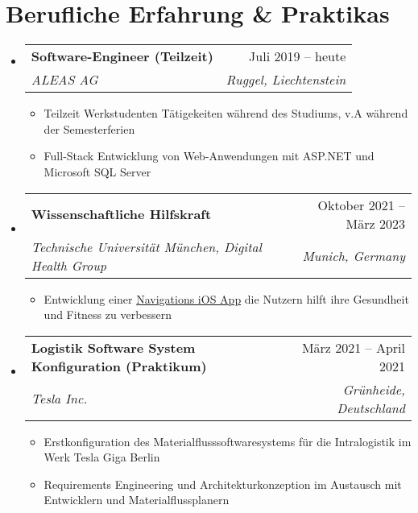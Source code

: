 \documentclass[letterpaper,11pt]{article}
\makeatletter
\newcommand{\resumeItem}[1]{
  \item\small{
    {#1 \vspace{-2pt}}
  }
}
\newcommand{\resumeSubheading}[4]{
  \vspace{-2pt}\item
    \begin{tabular*}{0.97\textwidth}[t]{l@{\extracolsep{\fill}}r}
      \textbf{#1} & #2 \\
      \textit{\small#3} & \textit{\small #4} \\
    \end{tabular*}\vspace{-7pt}
}
\newcommand{\resumeSubHeadingListStart}{\begin{itemize}[leftmargin=0.15in, label={}]}
\newcommand{\resumeSubHeadingListEnd}{\end{itemize}}
\newcommand{\resumeItemListStart}{\begin{itemize}}
\newcommand{\resumeItemListEnd}{\end{itemize}\vspace{-5pt}}
\makeatother
\begin{document}
\section{Berufliche Erfahrung \& Praktikas}
  \resumeSubHeadingListStart

    \resumeSubheading
      {Software-Engineer (Teilzeit)}{Juli 2019 -- heute}
      {ALEAS AG}{Ruggel, Liechtenstein}
      \resumeItemListStart
        \resumeItem{Teilzeit Werkstudenten Tätigekeiten während des Studiums, v.A während der Semesterferien}
        \resumeItem{Full-Stack Entwicklung von Web-Anwendungen mit ASP.NET und Microsoft SQL Server}
      \resumeItemListEnd

    \resumeSubheading
      {Wissenschaftliche Hilfskraft}{Oktober 2021 -- März 2023}
      {Technische Universität München, Digital Health Group}{Munich, Germany}
      \resumeItemListStart
        \resumeItem{Entwicklung einer \href{https://github.com/dhg-applab/HeMo}{Navigations iOS App} die Nutzern hilft ihre Gesundheit und Fitness zu verbessern}
      \resumeItemListEnd

    \resumeSubheading
      {Logistik Software System Konfiguration (Praktikum)}{März 2021 -- April 2021}
      {Tesla Inc.}{Grünheide, Deutschland}
      \resumeItemListStart
     
        \resumeItem{Erstkonfiguration des Materialflusssoftwaresystems für die Intralogistik im Werk Tesla Giga Berlin}
        \resumeItem{Requirements Engineering und Architekturkonzeption im Austausch mit Entwicklern und Materialflussplanern}
      \resumeItemListEnd


  \resumeSubHeadingListEnd
\end{document}
